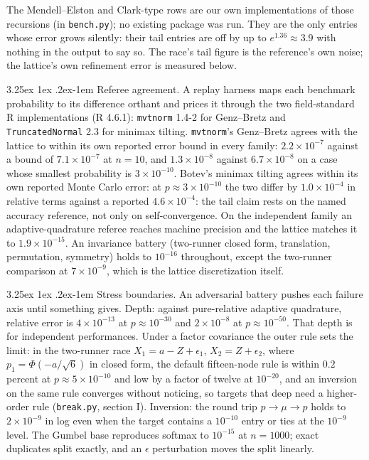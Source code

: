 \documentclass[11pt]{article}
\makeatletter
\renewcommand\paragraph{\@startsection{paragraph}{4}{\z@}%
  {3.25ex \@plus1ex \@minus.2ex}{-1em}%
  {\normalfont\normalsize\itshape}}
\makeatother
\begin{document}
The Mendell--Elston and Clark-type rows are our own implementations of
those recursions (in \texttt{bench.py}); no existing package was run.
They are the only
entries whose error grows
silently: their tail entries are off by up to $e^{1.36}\approx3.9$ with nothing in
the output to say so. The race's tail figure is the reference's own
noise; the lattice's own refinement error is measured below.

\paragraph{Referee agreement.} A replay harness maps each benchmark
probability to its difference orthant and prices it through the two
field-standard R implementations (R 4.6.1): \texttt{mvtnorm} 1.4-2 for
Genz--Bretz and \texttt{TruncatedNormal} 2.3 for minimax tilting.
\texttt{mvtnorm}'s Genz--Bretz agrees with
the lattice to within its own reported error bound in every family:
$2.2\times10^{-7}$ against a bound of $7.1\times10^{-7}$ at $n=10$, and
$1.3\times10^{-8}$ against $6.7\times10^{-8}$ on a case whose smallest
probability is $3\times10^{-10}$. Botev's minimax tilting agrees within its own
reported Monte Carlo error: at $p\approx3\times10^{-10}$ the two differ by
$1.0\times10^{-4}$ in relative terms against a reported $4.6\times10^{-4}$: the tail claim rests on the named accuracy
reference, not only on self-convergence. On the independent family an
adaptive-quadrature referee reaches machine precision and the lattice matches
it to $1.9\times10^{-15}$. An invariance battery (two-runner closed form,
translation, permutation, symmetry) holds to $10^{-16}$ throughout, except
the two-runner comparison at $7\times10^{-9}$, which is the lattice
discretization itself.

\paragraph{Stress boundaries.} An adversarial battery pushes each failure
axis until something gives. Depth: against pure-relative adaptive
quadrature, relative error is $4\times10^{-13}$ at $p\approx10^{-30}$ and
$2\times10^{-8}$ at $p\approx10^{-50}$. That depth is for independent performances. Under a factor
covariance the outer rule sets the limit: in the two-runner race
$X_1=a-Z+\epsilon_1$, $X_2=Z+\epsilon_2$, where $p_1=\Phi(-a/\sqrt6)$ in closed
form, the default fifteen-node rule is within $0.2$ percent at
$p\approx5\times10^{-10}$ and low by a factor of twelve at $10^{-20}$, and an
inversion on the same rule converges without noticing, so targets that
deep need a higher-order rule (\texttt{break.py}, section I).
Inversion: the round trip $p\to\mu\to p$ holds to $2\times10^{-9}$ in log even when
the target contains a $10^{-10}$ entry or ties at the $10^{-9}$ level. The
Gumbel base reproduces softmax to $10^{-15}$ at $n=1000$; exact duplicates
split exactly, and an $\epsilon$ perturbation moves the split linearly.
\end{document}
